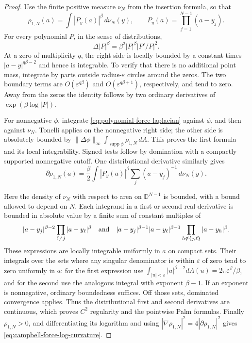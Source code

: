 \documentclass[11pt,a4paper]{article}
\numberwithin{equation}{section}
\theoremstyle{definition}
\theoremstyle{remark}
\newcommand{\D}{\mathbb D}
\newcommand{\supp}{\operatorname{supp}}
\begin{document}
\begin{proof}
Use the finite positive measure $\nu_N$ from the insertion formula,
so that
\[
 \rho_{1,N}(a)=\int |P_y(a)|^\beta\,d\nu_N(y),\qquad
 P_y(a)=\prod_{j=1}^{N-1}(a-y_j).
\]
For every polynomial $P$, in the sense of distributions,
\begin{equation}\label{eq:polynomial-force-laplacian}
 \Delta|P|^\beta=\beta^2|P|^\beta|P'/P|^2.
\end{equation}
At a zero of multiplicity $q$, the right side is locally bounded by
a constant times $|a-y|^{q\beta-2}$ and hence is integrable. To verify
that there is no additional point mass, integrate by parts outside
radius-$\varepsilon$ circles around the zeros. The two boundary terms
are $O(\varepsilon^{q\beta})$ and $O(\varepsilon^{q\beta+1})$,
respectively, and tend to zero. Away from the zeros the identity follows
by two ordinary derivatives of $\exp(\beta\log|P|)$.

For nonnegative $\phi$, integrate
\eqref{eq:polynomial-force-laplacian} against $\phi$, and then against
$\nu_N$. Tonelli applies on the nonnegative right side; the other side
is absolutely bounded by
$\|\Delta\phi\|_\infty\int_{\supp\phi}\rho_{1,N}\,dA$.
This proves the first formula and its local integrability. Signed tests
follow by domination with a compactly supported nonnegative cutoff.
One distributional derivative similarly gives
\[
 \partial\rho_{1,N}(a)
 =\frac\beta2\int |P_y(a)|^\beta
                   \sum_j(a-y_j)^{-1}\,d\nu_N(y).
\]

Here the density of $\nu_N$ with respect to area on $\D^{N-1}$ is
bounded, with a bound allowed to depend on $N$. Each integrand in a
first or second real derivative is bounded in absolute value by a
finite sum of constant multiples of
\[
 |a-y_j|^{\beta-2}\prod_{\ell\ne j}|a-y_\ell|^\beta
 \quad\hbox{and}\quad
 |a-y_j|^{\beta-1}|a-y_\ell|^{\beta-1}
                       \prod_{h\notin\{j,\ell\}}|a-y_h|^\beta.
\]
These expressions are locally integrable uniformly in $a$ on compact
sets. Their integrals over the sets where any singular denominator is
within $\varepsilon$ of zero tend to zero uniformly in $a$: for the
first expression use $\int_{|u|<\varepsilon}|u|^{\beta-2}dA(u)
=2\pi\varepsilon^\beta/\beta$, and for the second use the analogous
integral with exponent $\beta-1$. If an exponent is nonnegative, ordinary
boundedness suffices. Off those sets, dominated convergence applies.
Thus the distributional first and second derivatives are continuous,
which proves $C^2$ regularity and the pointwise Palm formulas.
Finally $\rho_{1,N}>0$, and differentiating its logarithm and using
$|\nabla\rho_{1,N}|^2=4|\partial\rho_{1,N}|^2$ gives
\eqref{eq:campbell-force-log-curvature}.
\end{proof}
\end{document}
